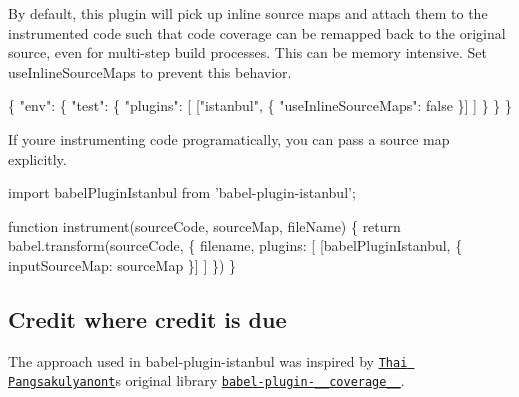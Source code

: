 By default, this plugin will pick up inline source maps and attach them to the instrumented code such that code coverage can be remapped back to the original source, even for multi-\/step build processes. This can be memory intensive. Set {\ttfamily use\+Inline\+Source\+Maps} to prevent this behavior.


\begin{DoxyCode}
\{
  "env": \{
    "test": \{
      "plugins": [
        ["istanbul", \{
          "useInlineSourceMaps": false
        \}]
      ]
    \}
  \}
\}
\end{DoxyCode}


If you\textquotesingle{}re instrumenting code programatically, you can pass a source map explicitly. 
\begin{DoxyCode}
import babelPluginIstanbul from 'babel-plugin-istanbul';

function instrument(sourceCode, sourceMap, fileName) \{
  return babel.transform(sourceCode, \{
    filename,
    plugins: [
      [babelPluginIstanbul, \{
        inputSourceMap: sourceMap
      \}]
    ]
  \})
\}
\end{DoxyCode}


\subsection*{Credit where credit is due}

The approach used in {\ttfamily babel-\/plugin-\/istanbul} was inspired by \href{https://github.com/dtinth}{\tt Thai Pangsakulyanont}\textquotesingle{}s original library \href{https://github.com/dtinth/babel-plugin-__coverage__}{\tt {\ttfamily babel-\/plugin-\/\+\_\+\+\_\+coverage\+\_\+\+\_\+}}. 